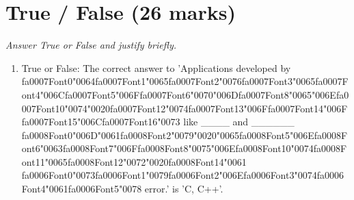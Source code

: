 \documentclass[12pt]{article}
\begin{document}
\section*{True / False (26 marks)}
\textit{Answer True or False and justify briefly.}
\begin{enumerate}[label=\arabic*.]
\item True or False: The correct answer to 'Applications developed by {\csname fa0007Font0\endcsname\char"0064}{\csname fa0007Font1\endcsname\char"0065}{\csname fa0007Font2\endcsname\char"0076}{\csname fa0007Font3\endcsname\char"0065}{\csname fa0007Font4\endcsname\char"006C}{\csname fa0007Font5\endcsname\char"006F}{\csname fa0007Font6\endcsname\char"0070}{\char"006D}{\csname fa0007Font8\endcsname\char"0065}{\char"006E}{\csname fa0007Font10\endcsname\char"0074}{\char"0020}{\csname fa0007Font12\endcsname\char"0074}{\csname fa0007Font13\endcsname\char"006F}{\csname fa0007Font14\endcsname\char"006F}{\csname fa0007Font15\endcsname\char"006C}{\csname fa0007Font16\endcsname\char"0073} like \_\_\_\_ and \_\_\_\_\_\_ {\csname fa0008Font0\endcsname\char"006D}{\char"0061}{\csname fa0008Font2\endcsname\char"0079}{\char"0020}{\char"0065}{\csname fa0008Font5\endcsname\char"006E}{\csname fa0008Font6\endcsname\char"0063}{\csname fa0008Font7\endcsname\char"006F}{\csname fa0008Font8\endcsname\char"0075}{\char"006E}{\csname fa0008Font10\endcsname\char"0074}{\csname fa0008Font11\endcsname\char"0065}{\csname fa0008Font12\endcsname\char"0072}{\char"0020}{\csname fa0008Font14\endcsname\char"0061} {\csname fa0006Font0\endcsname\char"0073}{\csname fa0006Font1\endcsname\char"0079}{\csname fa0006Font2\endcsname\char"006E}{\csname fa0006Font3\endcsname\char"0074}{\csname fa0006Font4\endcsname\char"0061}{\csname fa0006Font5\endcsname\char"0078} error.' is 'C, C++'.

\end{enumerate}
\end{document}
